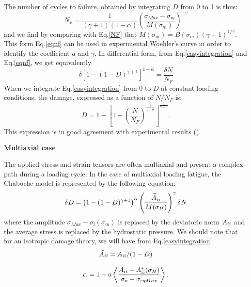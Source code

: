 The number of cycles to failure, obtained by integrating $D$ from 0 to 1 is thus:
\begin{equation}N_F=\frac{1}{(\gamma+1)(1-\alpha)}\left(\frac{\sigma_{Max}-\sigma_m}{M(\sigma_m)}\right)^{-\gamma}
\label{eqnf}
\end{equation}
and we find by comparing with Eq.\eqref{NF} that $M(\sigma_m)=B(\sigma_m)(\gamma+1)^{1/\gamma}$. This form Eq.\eqref{eqnf} can be used in experimental Woehler's curve in order to identify the coefficient $a$ and $\gamma$. In differential form,  from Eq.\eqref{easyintegration} and Eq.\eqref{eqnf}, we get equivalently
\begin{equation}\delta [1-(1-D)^{\gamma+1}]^{1-\alpha}=\frac{\delta N}{N_F}
\label{diffform}
\end{equation}
When we integrate Eq.\eqref{easyintegration} from $0$ to $D$ at constant loading conditions, the damage, expressed as a function of $N/N_F$ is:
\begin{equation}D=1-\left[ 1-\left( \frac{N}{N_F}\right) ^{\frac{1}{1-\alpha}}\right] ^{\frac{1}{\gamma+1}}.
\end{equation}
This expression is in good agreement with experimental results (\cite{lemaitre1990mechanics}). 

\vspace{6pt}
\textbf{Multiaxial case}
\vspace{6pt}

The applied stress and strain tensors are often multiaxial and present a complex path during a loading cycle. In the case of multiaxial loading fatigue, the Chaboche model is represented by the following equation:
\begin{equation}\delta D = \left( 1 -(1-D)^{\gamma+1}\right)^\alpha \left(\frac{\widetilde{A}_{\uppercase\expandafter{\romannumeral2}}}{M(\sigma_H)}\right)^\gamma \delta N
\label{chabochemulti}
\end{equation} 
where the amplitude $\sigma_{Max}-\sigma_l(\sigma_m)$ is replaced by the deviatoric norm $A_{\uppercase\expandafter{\romannumeral2}}$ and the average stress is replaced by the hydrostatic pressure. We should note that for an isotropic damage theory, we will have from Eq.\eqref{easyintegration}
$$\widetilde{A}_{\uppercase\expandafter{\romannumeral2}}=A_{\uppercase\expandafter{\romannumeral2}}/(1-D)$$

\begin{equation}\alpha = 1 - a\left\langle \frac{A_{\uppercase\expandafter{\romannumeral2}} - A_{\uppercase\expandafter{\romannumeral2}}^\ast(\sigma_H)}{ \sigma_{u} - \sigma_{eqMax}}\right\rangle.\end{equation}


